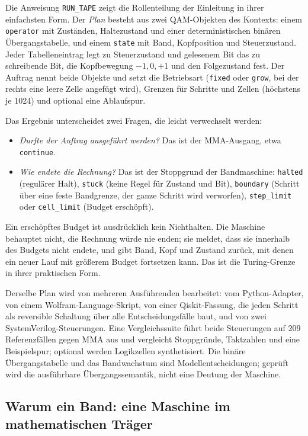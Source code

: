 Die Anweisung \texttt{RUN\_TAPE} zeigt die Rollenteilung der Einleitung in ihrer einfachsten Form. Der \emph{Plan} besteht aus zwei
QAM-Objekten des Kontexts: einem \texttt{operator} mit Zuständen, Haltezustand und einer deterministischen binären Übergangstabelle, und
einem \texttt{state} mit Band, Kopfposition und Steuerzustand. Jeder Tabelleneintrag legt zu Steuerzustand und gelesenem Bit das zu
schreibende Bit, die Kopfbewegung \(-1,0,+1\) und den Folgezustand fest. Der Auftrag nennt beide Objekte und setzt die Betriebsart
(\texttt{fixed} oder \texttt{grow}, bei der rechts eine leere Zelle angefügt wird), Grenzen für Schritte und Zellen (höchstens je 1024) und
optional eine Ablaufspur.

Das Ergebnis unterscheidet zwei Fragen, die leicht verwechselt werden:
\begin{itemize}[nosep]
\item \emph{Durfte der Auftrag ausgeführt werden?} Das ist der MMA-Ausgang, etwa \texttt{continue}.
\item \emph{Wie endete die Rechnung?} Das ist der Stoppgrund der Bandmaschine: \texttt{halted} (regulärer Halt), \texttt{stuck} (keine
Regel für Zustand und Bit), \texttt{boundary} (Schritt über eine feste Bandgrenze, der ganze Schritt wird verworfen), \texttt{step\_limit}
oder \texttt{cell\_limit} (Budget erschöpft).
\end{itemize}
Ein erschöpftes Budget ist ausdrücklich kein Nichthalten. Die Maschine behauptet nicht, die Rechnung würde nie enden; sie meldet, dass sie
innerhalb des Budgets nicht endete, und gibt Band, Kopf und Zustand zurück, mit denen ein neuer Lauf mit größerem Budget fortsetzen kann.
Das ist die Turing-Grenze in ihrer praktischen Form.

Derselbe Plan wird von mehreren Ausführenden bearbeitet: vom Python-Adapter, von einem Wolfram-Language-Skript, von einer Qiskit-Fassung,
die jeden Schritt als reversible Schaltung über alle Entscheidungsfälle baut, und von zwei SystemVerilog-Steuerungen. Eine
Vergleichssuite führt beide Steuerungen auf 209 Referenzfällen gegen MMA aus und vergleicht Stoppgründe, Taktzahlen und eine
Beispielspur; optional werden Logikzellen synthetisiert. Die binäre Übergangstabelle und das Bandwachstum sind Modellentscheidungen; geprüft
wird die ausführbare Übergangssemantik, nicht eine Deutung der Maschine.

\subsection{Warum ein Band: eine Maschine im mathematischen Träger}\label{sec:traeger}

